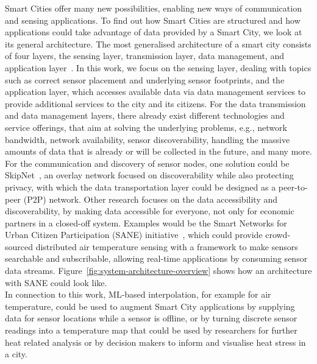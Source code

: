 Smart Cities offer many new possibilities, enabling new ways of communication and sensing applications. To find out how Smart Cities are structured and how applications could take advantage of data provided by a Smart City, we look at its general architecture.
The most generalised architecture of a smart city consists of four layers, the sensing layer, transmission layer, data management, and application layer~\cite{silva2018towards}. In this work, we focus on the sensing layer, dealing with topics such as correct sensor placement and underlying sensor footprints, and the application layer, which accesses available data via data management services to provide additional services to the city and its citizens. For the data transmission and data management layers, there already exist different technologies and service offerings, that aim at solving the underlying problems, e.g., network bandwidth, network availability, sensor discoverability, handling the massive amounts of data that is already or will be collected in the future, and many more. For the communication and discovery of sensor nodes, one solution could be SkipNet~\cite{harvey2002skipnet}, an overlay network focused on discoverability while also protecting privacy, with which the data transportation layer could be designed as a peer-to-peer (P2P) network. Other research focuses on the data accessibility and discoverability, by making data accessible for everyone, not only for economic partners in a closed-off system. Examples would be the Smart Networks for Urban Citizen Participation (SANE) initiative~\cite{bornholdt2019sane}, which could provide crowd-sourced distributed air temperature sensing with a framework to make sensors searchable and subscribable, allowing real-time applications by consuming sensor data streams. Figure~\ref{fig:system-architecture-overview} shows how an architecture with SANE could look like.\\
In connection to this work, ML-based interpolation, for example for air temperature, could be used to augment Smart City applications by supplying data for sensor locations while a sensor is offline, or by turning discrete sensor readings into a temperature map that could be used by researchers for further heat related analysis or by decision makers to inform and visualise heat stress in a city.\\

